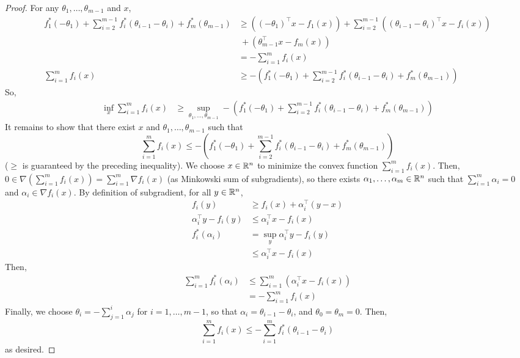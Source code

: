 \begin{proof}
For any $\theta_{1},\ldots,\theta_{m-1}$ and $x$, 
\begin{align*}
f^{*}_{1}(-\theta_{1})+\sum^{m-1}_{i=2}f^{*}_{i}(\theta_{i-1}-\theta_{i})+f^{*}_{m}(\theta_{m-1}) & \ge((-\theta_{1})^{\top}x-f_{1}(x))+\sum^{m-1}_{i=2}((\theta_{i-1}-\theta_{i})^{\top}x-f_{i}(x))\\
 & ~+(\theta^{\top}_{m-1}x-f_{m}(x))\\
 & =-\sum^{m}_{i=1}f_{i}(x)\\
\sum^{m}_{i=1}f_{i}(x) & \ge-(f^{*}_{1}(-\theta_{1})+\sum^{m-1}_{i=2}f^{*}_{i}(\theta_{i-1}-\theta_{i})+f^{*}_{m}(\theta_{m-1}))
\end{align*}
So, 
\begin{align*}
\inf_{x}\sum^{m}_{i=1}f_{i}(x) & \ge\sup_{\theta_{1},\ldots,\theta_{m-1}}-(f^{*}_{1}(-\theta_{1})+\sum^{m-1}_{i=2}f^{*}_{i}(\theta_{i-1}-\theta_{i})+f^{*}_{m}(\theta_{m-1}))
\end{align*}
It remains to show that there exist $x$ and $\theta_{1},\ldots,\theta_{m-1}$
such that 
\[
\sum^{m}_{i=1}f_{i}(x)\le-(f^{*}_{1}(-\theta_{1})+\sum^{m-1}_{i=2}f^{*}_{i}(\theta_{i-1}-\theta_{i})+f^{*}_{m}(\theta_{m-1}))
\]
($\ge$ is guaranteed by the preceding inequality). We choose $x\in\mathbb{R}^{n}$
to minimize the convex function $\sum^{m}_{i=1}f_{i}(x)$. Then, $0\in\nabla(\sum^{m}_{i=1}f_{i}(x))=\sum^{m}_{i=1}\nabla f_{i}(x)$
(as Minkowski sum of subgradients), so there exists $\alpha_{1},\ldots,\alpha_{m}\in\mathbb{R}^{n}$
such that $\sum^{m}_{i=1}\alpha_{i}=0$ and $\alpha_{i}\in\nabla f_{i}(x)$.
By definition of subgradient, for all $y\in\mathbb{R}^{n}$, 
\begin{align*}
f_{i}(y) & \ge f_{i}(x)+\alpha^{\top}_{i}(y-x)\\
\alpha^{\top}_{i}y-f_{i}(y) & \le\alpha^{\top}_{i}x-f_{i}(x)\\
f^{*}_{i}(\alpha_{i}) & =\sup_{y}\alpha^{\top}_{i}y-f_{i}(y)\\
 & \le\alpha^{\top}_{i}x-f_{i}(x)
\end{align*}
Then, 
\begin{align*}
\sum^{m}_{i=1}f^{*}_{i}(\alpha_{i}) & \le\sum^{m}_{i=1}\left(\alpha^{\top}_{i}x-f_{i}(x)\right)\\
 & =-\sum^{m}_{i=1}f_{i}(x)
\end{align*}
Finally, we choose $\theta_{i}=-\sum^{i}_{j=1}\alpha_{j}$ for $i=1,\ldots,m-1$,
so that $\alpha_{i}=\theta_{i-1}-\theta_{i}$, and $\theta_{0}=\theta_{m}=0$.
Then, 
\[
\sum^{m}_{i=1}f_{i}(x)\le-\sum^{m}_{i=1}f^{*}_{i}(\theta_{i-1}-\theta_{i})
\]
as desired.
\end{proof}
